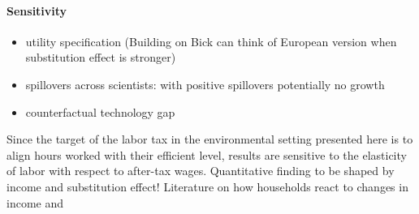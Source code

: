 
\paragraph{Sensitivity}
\begin{itemize}
	\item utility specification (Building on Bick can think of European version when substitution effect is stronger)
	\item spillovers across scientists: with positive spillovers potentially no growth
	\item counterfactual technology gap
\end{itemize}

Since the target of the labor tax in the environmental setting presented here is to align hours worked with their efficient level, results are sensitive to the elasticity of labor with respect to after-tax wages. 
Quantitative finding to be shaped by income and substitution effect!
Literature on how households react to changes in income \cite{Bick2018HowImplications} and \cite{Boppart2019LaborPerspectiveb}



